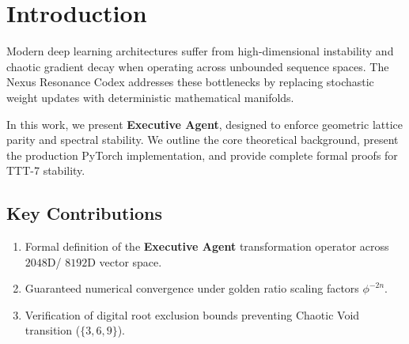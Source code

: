 \section{Introduction}
Modern deep learning architectures suffer from high-dimensional instability and chaotic gradient decay when operating across unbounded sequence spaces. The Nexus Resonance Codex addresses these bottlenecks by replacing stochastic weight updates with deterministic mathematical manifolds.

In this work, we present \textbf{Executive Agent}, designed to enforce geometric lattice parity and spectral stability. We outline the core theoretical background, present the production PyTorch implementation, and provide complete formal proofs for TTT-7 stability.

\subsection{Key Contributions}
\begin{enumerate}[label=\textbf{\arabic*.}]
    \item Formal definition of the \textbf{Executive Agent} transformation operator across $2048$D/ $8192$D vector space.
    \item Guaranteed numerical convergence under golden ratio scaling factors $\phi^{-2n}$.
    \item Verification of digital root exclusion bounds preventing Chaotic Void transition ($\{3, 6, 9\}$).
\end{enumerate}